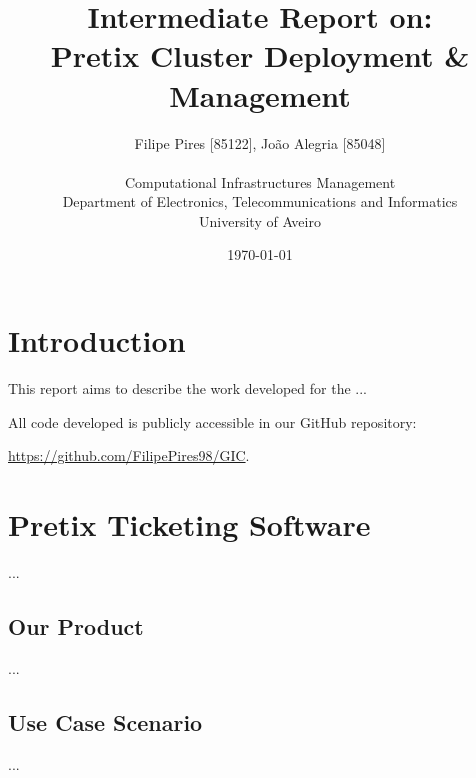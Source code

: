 \documentclass[12pt]{article}
\title{Intermediate Report on:\\Pretix Cluster Deployment \& Management}
\author
{Filipe Pires [85122], João Alegria [85048]\\
\\
Computational Infrastructures Management\\
\normalsize{Department of Electronics, Telecommunications and Informatics}\\
\normalsize{University of Aveiro}\\
}
\date{\today{}}
\begin{document}
 

\baselineskip18pt

\maketitle 

\section*{Introduction} \label{introduction} %

This report aims to describe the work developed for the ...

All code developed is publicly accessible in our GitHub repository:

\url{https://github.com/FilipePires98/GIC}.

\newpage
\section{Pretix Ticketing Software} \label{pretix} %


...

\subsection{Our Product} \label{pretix.product} %


...

\subsection{Use Case Scenario} \label{pretix.scenario} %

...


\end{document}
